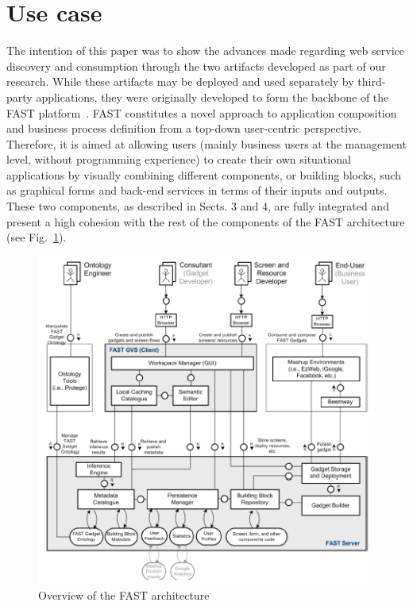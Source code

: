
\section{Use case}
\label{sec:use_case}

The intention of this paper was to show the advances made regarding web service discovery and consumption through the two artifacts developed as part of our research. While these artifacts may be deployed and used separately by third-party applications, they were originally developed to form the backbone of the FAST platform~\cite{hoyer2009fast}.
FAST constitutes a novel approach to application composition and business process definition from a top-down user-centric perspective. Therefore, it is aimed at allowing users (mainly business users at the management level, without programming experience) to create their own situational applications by visually combining different components, or building blocks, such as graphical forms and back-end services in terms of their inputs and outputs. These two components, as described in Sects. 3 and 4, are fully integrated and present a high cohesion with the rest of the components of the FAST architecture (see Fig.~\ref{fig:fast_architecture}). 

\begin{figure}[ht]
  \begin{center}
    \includegraphics[width=.9\linewidth]{images/fast_architecture.png}
    \caption{Overview of the FAST architecture}
    \label{fig:fast_architecture}
  \end{center}
\end{figure}

